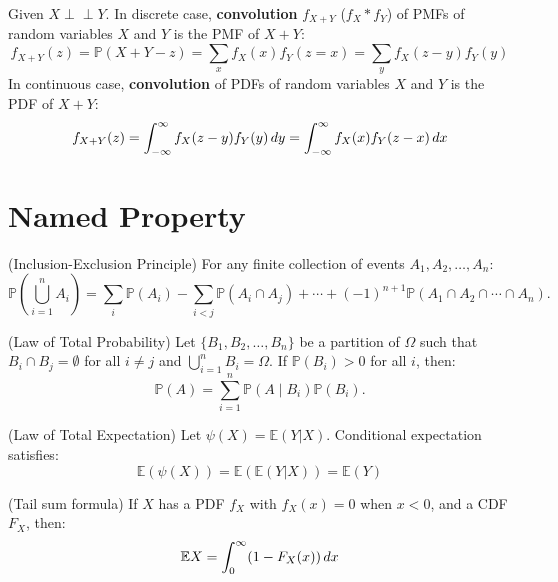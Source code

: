 \documentclass{huhtakm-template-book}
\newcommand{\independent}{\perp\!\!\!\perp}
\newcommand{\prob}{\mathbb{P}}
\newcommand{\expect}{\mathbb{E}}
\begin{document}
    \begin{sdefn}
        Given $X\independent Y$. In discrete case, \textbf{convolution} $f_{X+Y}$ ($f_{X}*f_{Y}$) of PMFs of random variables $X$ and $Y$ is the PMF of $X+Y$:
        \begin{equation*}
            f_{X+Y}(z)=\prob(X+Y-z)=\sum_{x}f_{X}(x)f_{Y}(z=x)=\sum_{y}f_{X}(z-y)f_{Y}(y)
        \end{equation*}
        In continuous case, \textbf{convolution} of PDFs of random variables $X$ and $Y$ is the PDF of $X+Y$:
        \begin{equation*}
            f_{X+Y}(z)=\int_{-\infty}^{\infty} f_{X}(z-y)f_{Y}(y)\,dy=\int_{-\infty}^{\infty} f_{X}(x)f_{Y}(z-x)\,dx
        \end{equation*}
    \end{sdefn}
    
\section*{Named Property}
    \begin{spro}(Inclusion-Exclusion Principle)
    For any finite collection of events $A_{1}, A_{2}, \dots, A_{n}$:
    \begin{equation*}
        \prob\left(\bigcup_{i=1}^{n}A_{i}\right)=\sum_{i}\prob(A_{i})-\sum_{i<j}\prob(A_{i}\cap A_{j})+\cdots+(-1)^{n+1}\prob(A_{1}\cap A_{2}\cap\cdots\cap A_{n}).
    \end{equation*}
    \end{spro}
    \begin{spro}(Law of Total Probability)
    Let $\{B_{1},B_{2},\dots,B_{n}\}$ be a partition of $\Omega$ such that $B_{i}\cap B_{j}=\emptyset$ for all $i\neq j$ and $\bigcup_{i=1}^{n}B_{i} = \Omega$. If $\prob(B_{i})>0$ for all $i$, then:
    \begin{equation*}
        \prob(A)=\sum_{i=1}^{n}\prob(A\mid B_{i})\prob(B_{i}).
    \end{equation*}
    \end{spro}
    \begin{spro}(Law of Total Expectation)
        Let $\psi(X)=\expect(Y|X)$. Conditional expectation satisfies:
        \begin{equation*}
            \expect(\psi(X))=\expect(\expect(Y|X))=\expect(Y)
        \end{equation*}
    \end{spro}
    \begin{spro}(Tail sum formula)
        If $X$ has a PDF $f_{X}$ with $f_{X}(x)=0$ when $x<0$, and a CDF $F_{X}$, then:
        \begin{equation*}
            \expect X=\intlu{0}{\infty}(1-F_{X}(x))\,dx
        \end{equation*}
    \end{spro}
    \newpage
\end{document}
